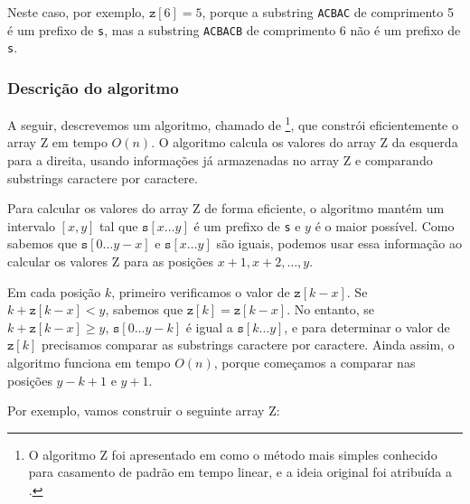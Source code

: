 Neste caso, por exemplo, $\texttt{z}[6]=5$, porque a substring \texttt{ACBAC} de comprimento 5 é um prefixo de \texttt{s}, mas a substring \texttt{ACBACB} de comprimento 6 não é um prefixo de \texttt{s}.

\subsubsection*{Descrição do algoritmo}

A seguir, descrevemos um algoritmo, chamado de \footnote{O algoritmo Z foi apresentado em \cite{gus97} como o método mais simples conhecido para casamento de padrão em tempo linear, e a ideia original foi atribuída a \cite{mai84}.}, que constrói eficientemente o array Z em tempo $O(n)$. O algoritmo calcula os valores do array Z da esquerda para a direita, usando informações já armazenadas no array Z e comparando substrings caractere por caractere.

Para calcular os valores do array Z de forma eficiente, o algoritmo mantém um intervalo $[x,y]$ tal que $\texttt{s}[x \ldots y]$ é um prefixo de \texttt{s} e $y$ é o maior possível. Como sabemos que $\texttt{s}[0 \ldots y-x]$ e $\texttt{s}[x \ldots y]$ são iguais, podemos usar essa informação ao calcular os valores Z para as posições $x+1,x+2,\ldots,y$.

Em cada posição $k$, primeiro verificamos o valor de $\texttt{z}[k-x]$. Se $k+\texttt{z}[k-x]<y$, sabemos que $\texttt{z}[k]=\texttt{z}[k-x]$. No entanto, se $k+\texttt{z}[k-x] \ge y$, $\texttt{s}[0 \ldots y-k]$ é igual a $\texttt{s}[k \ldots y]$, e para determinar o valor de $\texttt{z}[k]$ precisamos comparar as substrings caractere por caractere. Ainda assim, o algoritmo funciona em tempo $O(n)$, porque começamos a comparar nas posições $y-k+1$ e $y+1$.

Por exemplo, vamos construir o seguinte array Z:

